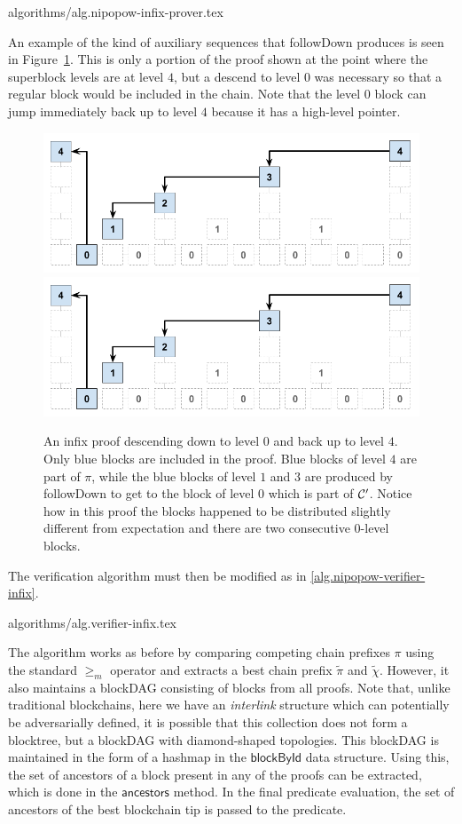 {algorithms/alg.nipopow-infix-prover.tex}

An example of the kind of auxiliary sequences that followDown produces is seen
in Figure~\ref{fig.infix}. This is only a portion of the proof shown at the
point where the superblock levels are at level $4$, but a descend to level $0$
was necessary so that a regular block would be included in the chain. Note that
the level $0$ block can jump immediately back up to level $4$ because it has a
high-level pointer.

\begin{figure}[h]
    \caption{An infix proof descending down to level $0$ and back up to level
    $4$. Only blue blocks are included in the proof. Blue blocks of level $4$
    are part of $\pi$, while the blue blocks of level $1$ and $3$ are produced
    by followDown to get to the block of level $0$ which is part of $\mathcal{C}'$.
    Notice how in this proof the blocks happened to be distributed slightly
    different from expectation and there are two consecutive $0$-level blocks.}
    \centering
    \iftwocolumn
        \includegraphics[width=\columnwidth,keepaspectratio]{figures/infix.png}
    \else
        \includegraphics[width=0.7\columnwidth,keepaspectratio]{figures/infix.png}
    \fi
    \label{fig.infix}
\end{figure}

The verification algorithm must then be modified as in
\ref{alg.nipopow-verifier-infix}.

{algorithms/alg.verifier-infix.tex}

The algorithm works as before by comparing competing chain prefixes $\pi$ using
the standard $\geq_m$ operator and extracts a best chain prefix $\tilde\pi$ and
$\tilde\chi$. However, it also maintains a blockDAG consisting of blocks from
all proofs. Note that, unlike traditional blockchains, here we have an
\textit{interlink} structure which can potentially be adversarially defined, it
is possible that this collection does not form a blocktree, but a blockDAG with
diamond-shaped topologies. This blockDAG is maintained in the form of a hashmap
in the $\textsf{blockById}$ data structure. Using this, the set of ancestors of
a block present in any of the proofs can be extracted, which is done in the
$\textsf{ancestors}$ method. In the final predicate evaluation, the set of
ancestors of the best blockchain tip is passed to the predicate.

